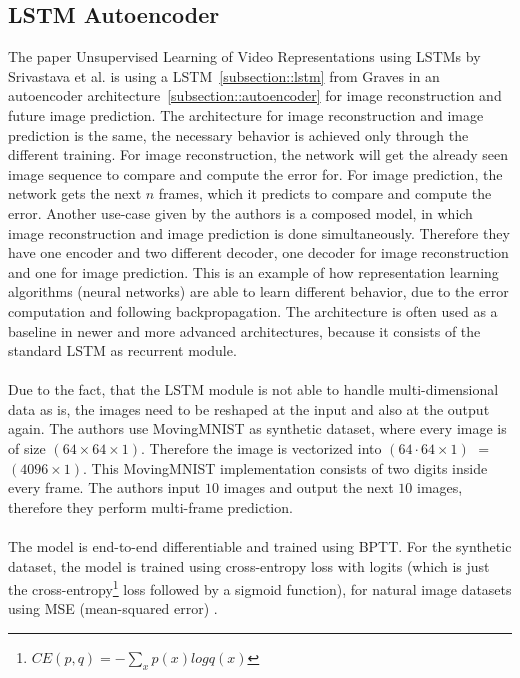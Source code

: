  \subsection{LSTM Autoencoder} \label{subsection::lstm_autoencoder}
  The paper \glqq Unsupervised Learning of Video Representations using LSTMs\grqq{} by Srivastava et al. \cite{Srivastava2015} is using a LSTM~\ref{subsection::lstm} from Graves 
  \cite{Graves2013} in an autoencoder architecture~\ref{subsection::autoencoder} for image reconstruction and future image prediction.
  The architecture for image reconstruction and image prediction is the same, the necessary behavior is achieved only through the different training.
  For image reconstruction, the network will get the already seen image sequence to compare and compute the error for. For image prediction, the network gets
  the next $n$ frames, which it predicts to compare and compute the error.
  Another use-case given by the authors is a composed model, in which image reconstruction and image prediction is done simultaneously. Therefore they have
  one encoder and two different decoder, one decoder for image reconstruction and one for image prediction.
  This is an example of how representation learning algorithms (neural networks) are able to learn different behavior, due to the error computation and following
  backpropagation.
  The architecture is often used as a baseline in newer and more advanced architectures, because it consists of the standard LSTM as recurrent module.
  \\\\
  Due to the fact, that the LSTM module is not able to handle multi-dimensional data as is, the images need to be reshaped at the input and also at the output again. The authors use
  MovingMNIST \cite{LeCun1998} as synthetic dataset, where every image is of size $(64 \times 64 \times 1)$. Therefore the image is vectorized into $(64 \cdot 64 \times 1)$ $=$ $(4096 \times 1)$.
  This MovingMNIST implementation consists of two digits inside every frame. The authors input $10$ images and output the next $10$ images, therefore they perform 
  multi-frame prediction.
  \\\\
  The model is end-to-end differentiable and trained using BPTT.
  For the synthetic dataset, the model is trained using cross-entropy loss with logits (which is just the cross-entropy\footnote{$CE(p,q) = -\sum_xp(x)logq(x)$} 
  loss followed by a sigmoid function), for natural image datasets using MSE (mean-squared error) \cite{Zhao2017}.

